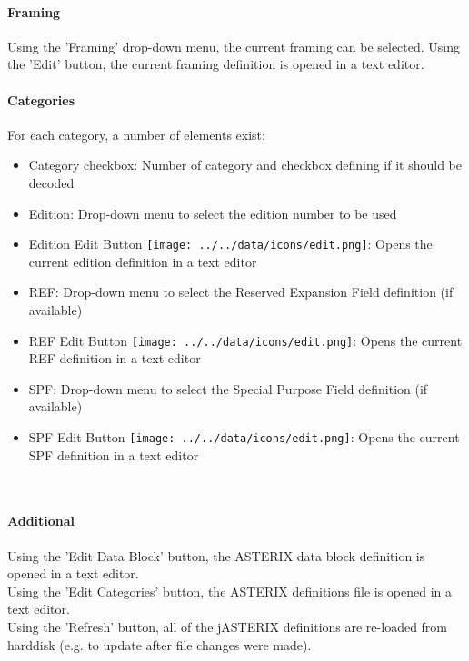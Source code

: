 \paragraph{Framing}
Using the 'Framing' drop-down menu, the current framing can be selected. Using the 'Edit' button, the current framing definition is opened in a text editor.

\paragraph{Categories}

For each category, a number of elements exist:

\begin{itemize}
\item Category checkbox: Number of category and checkbox defining if it should be decoded
\item Edition: Drop-down menu to select the edition number to be used
\item Edition Edit Button \texttt{[image: ../../data/icons/edit.png]}: Opens the current edition definition in a text editor
\item REF: Drop-down menu to select the Reserved Expansion Field definition (if available)
\item REF Edit Button \texttt{[image: ../../data/icons/edit.png]}: Opens the current REF definition in a text editor
\item SPF: Drop-down menu to select the Special Purpose Field definition (if available)
\item SPF Edit Button \texttt{[image: ../../data/icons/edit.png]}: Opens the current SPF definition in a text editor
\end{itemize}
\ \\

\paragraph{Additional}

Using the 'Edit Data Block' button, the ASTERIX data block definition is opened in a text editor. \\

Using the 'Edit Categories' button, the ASTERIX definitions file is opened in a text editor. \\

Using the 'Refresh' button, all of the jASTERIX definitions are re-loaded from harddisk (e.g. to update after file changes were made). \\


